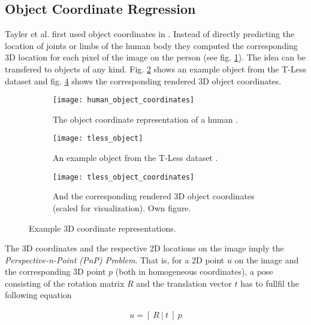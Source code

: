 \subsection{Object Coordinate Regression} \label{objectcoordinates}

Tayler et al. first used object coordinates in \cite{tsharp}. Instead of directly predicting the location of joints or limbs of the human body they computed the corresponding 3D location for each pixel of the image on the person (see fig. \ref{fig:human_object_coordinates}). The idea can be transfered to objects of any kind. Fig. \ref{fig:tless_object} shows an example object from the T-Less dataset \cite{tless} and fig. \ref{fig:tless_object_coordinates} shows the corresponding rendered 3D object coordinates.

\begin{figure}[!tbp]
	\centering
	\begin{subfigure}[t]{0.3\textwidth}
		\centering
    	\texttt{[image: human\_object\_coordinates]}
    	\caption{The object coordinate representation of a human  \cite{tsharp}.}
    	\label{fig:human_object_coordinates}
	\end{subfigure}
	\begin{subfigure}[t]{0.3\textwidth}
		\centering
    	\texttt{[image: tless\_object]}
    	\caption{An example object from the T-Less dataset \cite{tless}.}
    	\label{fig:tless_object}
	\end{subfigure}
	\begin{subfigure}[t]{0.3\textwidth}
		\centering
    	\texttt{[image: tless\_object\_coordinates]}
    	\caption{And the corresponding rendered 3D object coordinates (scaled for visualization). Own figure.}
    	\label{fig:tless_object_coordinates}
	\end{subfigure}
	\caption{Example 3D coordinate representations.}
\end{figure} 

The 3D coordinates and the respective 2D locations on the image imply the \textit{Perspective-n-Point (PnP) Problem}. That is, for a 2D point $u$ on the image and the corresponding 3D point $p$ (both in homogeneous coordinates), a pose consisting of the rotation matrix $R$ and the translation vector $t$ has to fullfil the following equation

\begin{align}
 u = [ \ R \ | \ t \ ] \ p
\end{align} 

